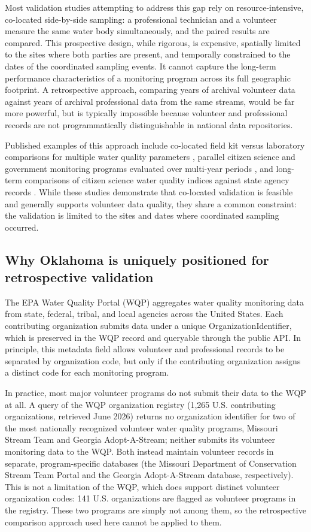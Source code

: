 \documentclass[lineno]{wlpeerj}
\begin{document}
Most validation studies attempting to address this gap rely on resource-intensive, co-located side-by-side sampling: a professional technician and a volunteer measure the same water body simultaneously, and the paired results are compared. This prospective design, while rigorous, is expensive, spatially limited to the sites where both parties are present, and temporally constrained to the dates of the coordinated sampling events. It cannot capture the long-term performance characteristics of a monitoring program across its full geographic footprint. A retrospective approach, comparing years of archival volunteer data against years of archival professional data from the same streams, would be far more powerful, but is typically impossible because volunteer and professional records are not programmatically distinguishable in national data repositories.

Published examples of this approach include co-located field kit versus laboratory comparisons for multiple water quality parameters \citep{Quinlivan2020}, parallel citizen science and government monitoring programs evaluated over multi-year periods \citep{Dickson2024}, and long-term comparisons of citizen science water quality indices against state agency records \citep{deCamargoReis2026}. While these studies demonstrate that co-located validation is feasible and generally supports volunteer data quality, they share a common constraint: the validation is limited to the sites and dates where coordinated sampling occurred.

\subsection{Why Oklahoma is uniquely positioned for retrospective validation}

The EPA Water Quality Portal (WQP) aggregates water quality monitoring data from state, federal, tribal, and local agencies across the United States. Each contributing organization submits data under a unique OrganizationIdentifier, which is preserved in the WQP record and queryable through the public API. In principle, this metadata field allows volunteer and professional records to be separated by organization code, but only if the contributing organization assigns a distinct code for each monitoring program.

In practice, most major volunteer programs do not submit their data to the WQP at all. A query of the WQP organization registry (1,265 U.S. contributing organizations, retrieved June 2026) returns no organization identifier for two of the most nationally recognized volunteer water quality programs, Missouri Stream Team and Georgia Adopt-A-Stream; neither submits its volunteer monitoring data to the WQP. Both instead maintain volunteer records in separate, program-specific databases (the Missouri Department of Conservation Stream Team Portal and the Georgia Adopt-A-Stream database, respectively). This is not a limitation of the WQP, which does support distinct volunteer organization codes: 141 U.S. organizations are flagged as volunteer programs in the registry. These two programs are simply not among them, so the retrospective comparison approach used here cannot be applied to them.
\end{document}
